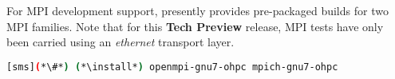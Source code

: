 For MPI development support, \OHPC{} presently provides pre-packaged builds for
two MPI families. Note that for this {\bf Tech Preview} release, MPI tests have only been
carried using an {\em ethernet} transport layer.

\begin{lstlisting}[language=bash]
[sms](*\#*) (*\install*) openmpi-gnu7-ohpc mpich-gnu7-ohpc
\end{lstlisting}



